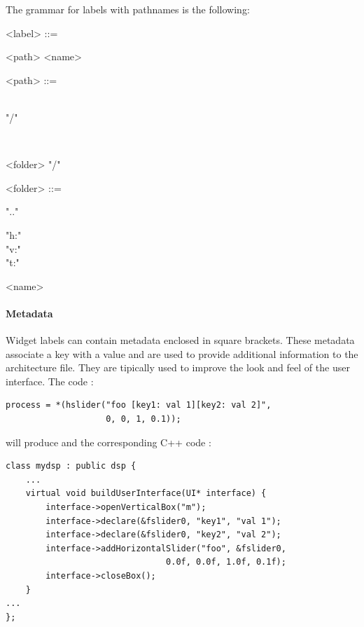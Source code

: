 \documentclass[a4paper,10pt]{book}
\begin{document}
The grammar for labels with pathnames is the following:
\begin{grammar}
  <label> ::= 
  \begin{syntdiag}
	<path> <name>
  \end{syntdiag}
\end{grammar}
%
\begin{grammar}
 <path> ::= 
  \begin{syntdiag}
	\begin{stack} \\ "/" \end{stack} 
	\begin{stack} \\ \begin{rep} <folder> "/" \end{rep} \end{stack} 
 \end{syntdiag}
\end{grammar}
%
\begin{grammar}
 <folder> ::= 
  \begin{syntdiag}
	\begin{stack}
		".." \\ 
		\begin{stack} "h:" \\ "v:" \\ "t:" \end{stack} <name>
	\end{stack}
 \end{syntdiag}
\end{grammar}



\paragraph{Metadata}
Widget labels can contain metadata enclosed in square brackets. These metadata associate a key with a value and are used to provide additional information to the architecture file.  They are tipically used to improve the look and feel of the user interface. 
The \faust code :
\begin{lstlisting}
process = *(hslider("foo [key1: val 1][key2: val 2]", 
					0, 0, 1, 0.1));
\end{lstlisting}

will produce and the corresponding C++ code :

\begin{lstlisting}
class mydsp : public dsp {
	...
	virtual void buildUserInterface(UI* interface) {
	    interface->openVerticalBox("m");
	    interface->declare(&fslider0, "key1", "val 1");
	    interface->declare(&fslider0, "key2", "val 2");
	    interface->addHorizontalSlider("foo", &fslider0, 
								0.0f, 0.0f, 1.0f, 0.1f);
	    interface->closeBox();
	}
...
};
\end{lstlisting}
\end{document}
